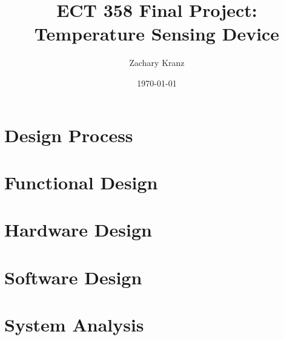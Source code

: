 \documentclass[12pt]{article}
\title{ECT 358 Final Project: Temperature Sensing Device}
\date{\today}
\author{Zachary Kranz}
\begin{document}
\maketitle

\section{Design Process}

\section{Functional Design}


\section{Hardware Design}


\section{Software Design}


\section{System Analysis}
\end{document}
